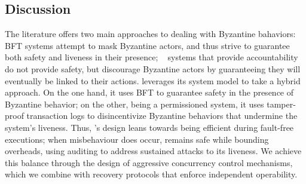 \subsection{Discussion}

The literature offers two main approaches to dealing with Byzantine bahaviors: \one~ BFT systems attempt to mask Byzantine actors, and thus strive to guarantee both safety and liveness in their presence; \two~ systems that provide  accountability do not provide safety, but discourage Byzantine actors by guaranteeing they will eventually be linked to their actions.  \sys{} leverages its system model to take a hybrid approach. On the one hand, it uses BFT to guarantee safety in the presence of Byzantine  behavior; on the other, being a permissioned system, it uses tamper-proof transaction logs to disincentivize  Byzantine behaviors that undermine the system's liveness.  Thus, \sys{}'s design leans towards  being efficient during fault-free executions; when misbehaviour does occur, \sys{} remains safe while bounding overheads, using auditing to address sustained attacks to its liveness.  We achieve this balance through the design of aggressive concurrency control mechanisms, which we combine with recovery protocols that enforce independent operability.





